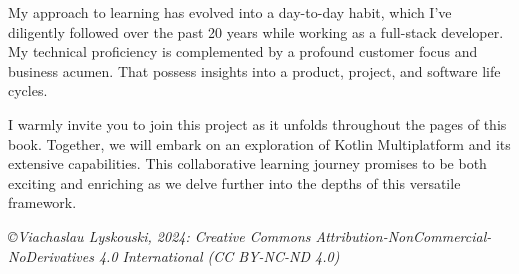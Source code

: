 \vspace{3mm}

\noindent My approach to learning has evolved into a day-to-day habit, which I've diligently followed over the past 
20 years while working as a full-stack developer. My technical proficiency is complemented by a profound customer 
focus and business acumen. That possess insights into a product, project, and software life cycles.

\vspace{3mm}

\noindent I warmly invite you to join this project as it unfolds throughout the pages of this book. Together, we will 
embark on an exploration of Kotlin Multiplatform and its extensive capabilities. This collaborative learning journey 
promises to be both exciting and enriching as we delve further into the depths of this versatile framework.


\vspace{1cm}

\noindent \emph{\small \copyright Viachaslau Lyskouski, 2024: Creative Commons Attribution-NonCommercial-NoDerivatives 
4.0 International (CC BY-NC-ND 4.0)}

\newpage
\thispagestyle{empty}
~